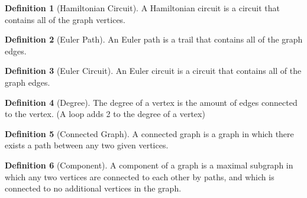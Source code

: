 \documentclass{article}
\theoremstyle{definition}
\newtheorem{definition}{Definition}[section]
\theoremstyle{definition}
\begin{document}
\begin{definition}[Hamiltonian Circuit]
    A Hamiltonian circuit is a circuit that contains all of the graph vertices.
\end{definition}

\begin{definition}[Euler Path]
    An Euler path is a trail that contains all of the graph edges.
\end{definition}

\begin{definition}[Euler Circuit]
    An Euler circuit is a circuit that contains all of the graph edges.
\end{definition}

\begin{definition}[Degree]
    The degree of a vertex is the amount of edges connected to the vertex. (A loop adds 2 to the degree of a vertex)
\end{definition}

\begin{definition}[Connected Graph]
    A connected graph is a graph in which there exists a path between any two given vertices.
\end{definition}

\begin{definition}[Component]
    A component of a graph is a maximal subgraph in which any two vertices are connected to each other by paths, and which is connected to no additional vertices in the graph.
\end{definition}
\end{document}
